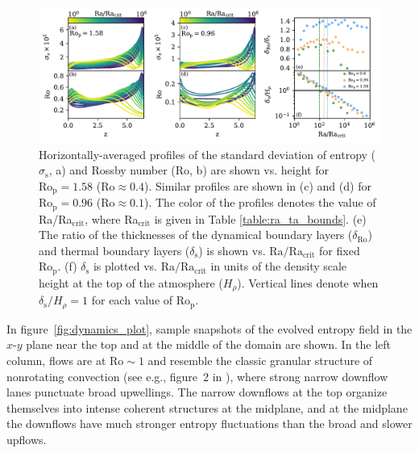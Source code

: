 \documentclass[twocolumn, amsmath, amsfonts, amssymb, trackchanges]{aastex62}
\newcommand{\pro}{\ensuremath{\text{Ro}_{\text{p}}}}
\begin{document}
\begin{figure}[ht!]
    \includegraphics[width=\textwidth]{boundary_layers.pdf}
    \caption{Horizontally-averaged profiles of the standard deviation of entropy ($\sigma_{\text{s}}$, a) and Rossby number (Ro, b) 
    are shown vs. height for $\pro = 1.58$ ($\text{Ro} \approx 0.4$). 
    Similar profiles are shown in (c) and (d) for $\pro = 0.96$ ($\text{Ro} \approx 0.1$). The color of the profiles
    denotes the value of Ra/Ra$_{\text{crit}}$, where Ra$_\text{crit}$ is given in Table \ref{table:ra_ta_bounds}.
    (e) The ratio of the thicknesses of the dynamical boundary layers ($\delta_{\text{Ro}}$) and 
    thermal boundary layers ($\delta_{\text{s}}$) is shown vs. $\text{Ra}/\text{Ra}_{\text{crit}}$ for fixed \pro.
	(f) $\delta_{\text{s}}$ is plotted vs. $\text{Ra}/\text{Ra}_{\text{crit}}$ in units of the density
	scale height at the top of the atmosphere ($H_\rho$). Vertical lines denote when $\delta_\text{s}/H_\rho = 1$
	for each value of \pro.
    \label{fig:profiles_and_bls} }
\end{figure}

In figure~\ref{fig:dynamics_plot}, sample snapshots of the evolved entropy field 
in the $x$-$y$ plane near the top and at the middle of the domain are shown. 
In the left column, flows are at $\text{Ro} \sim 1$ and resemble the classic granular structure 
of nonrotating convection (see e.g., figure~2 in \AB), where strong narrow downflow lanes 
punctuate broad upwellings. The narrow downflows at the top organize themselves into intense
coherent structures at the midplane, and at the midplane the downflows have much stronger
entropy fluctuations than the broad and slower upflows. 
\end{document}
